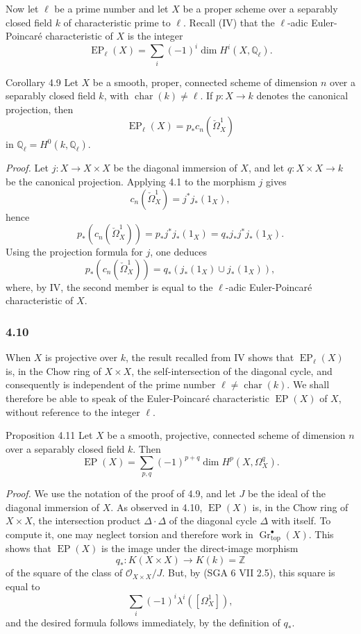 Now let $\ell$ be a prime number and let $X$ be a proper scheme over a separably closed field $k$ of characteristic prime to $\ell$. Recall (IV) that the $\ell$-adic Euler-Poincaré characteristic of $X$ is the integer
\[
\operatorname{EP}_\ell(X)=\sum_i(-1)^i\dim H^i(X,\mathbb Q_\ell).
\]

\begin{statement}{Corollary 4.9}
Let $X$ be a smooth, proper, connected scheme of dimension $n$ over a separably closed field $k$, with $\operatorname{char}(k)\ne\ell$. If $p:X\to k$ denotes the canonical projection, then
\[
\operatorname{EP}_\ell(X)=p_*c_n(\check\Omega^1_X)
\]
in $\mathbb Q_\ell=H^0(k,\mathbb Q_\ell)$.
\end{statement}

\emph{Proof.} Let $j:X\to X\times X$ be the diagonal immersion of $X$, and let $q:X\times X\to k$ be the canonical projection. Applying 4.1 to the morphism $j$ gives
\[
c_n(\check\Omega^1_X)=j^*j_*(1_X),
\]
hence
\[
p_*(c_n(\check\Omega^1_X))=p_*j^*j_*(1_X)=q_*j_*j^*j_*(1_X).
\]
Using the projection formula for $j$, one deduces
\[
p_*(c_n(\check\Omega^1_X))=q_*(j_*(1_X)\cup j_*(1_X)),
\]
where, by IV, the second member is equal to the $\ell$-adic Euler-Poincaré characteristic of $X$.

\subsubsection*{4.10}
When $X$ is projective over $k$, the result recalled from IV shows that $\operatorname{EP}_\ell(X)$ is, in the Chow ring of $X\times X$, the self-intersection of the diagonal cycle, and consequently is independent of the prime number $\ell\ne\operatorname{char}(k)$. We shall therefore be able to speak of the Euler-Poincaré characteristic $\operatorname{EP}(X)$ of $X$, without reference to the integer $\ell$.

\begin{statement}{Proposition 4.11}
Let $X$ be a smooth, projective, connected scheme of dimension $n$ over a separably closed field $k$. Then
\[
\operatorname{EP}(X)=\sum_{p,q}(-1)^{p+q}\dim H^p(X,\Omega_X^q).
\]
\end{statement}

\emph{Proof.} We use the notation of the proof of 4.9, and let $J$ be the ideal of the diagonal immersion of $X$. As observed in 4.10, $\operatorname{EP}(X)$ is, in the Chow ring of $X\times X$, the intersection product $\Delta\cdot\Delta$ of the diagonal cycle $\Delta$ with itself. To compute it, one may neglect torsion and therefore work in $\operatorname{Gr}_{\mathrm{top}}^\bullet(X)$. This shows that $\operatorname{EP}(X)$ is the image under the direct-image morphism
\[
q_*:K(X\times X)\to K(k)=\mathbb Z
\]
of the square of the class of $\mathcal O_{X\times X}/J$. But, by (SGA 6 VII 2.5), this square is equal to
\[
\sum_i(-1)^i\lambda^i([\Omega_X^1]),
\]
and the desired formula follows immediately, by the definition of $q_*$.


